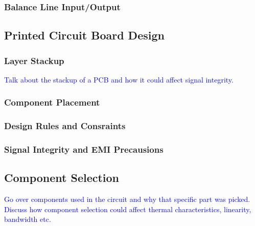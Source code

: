 \documentclass[10pt]{article}
\begin{document}
\begin{multicols*}{2}
\begin{minipage}{\linewidth}
\begin{tikzpicture}[scale = 0.9, transform shape]

                        \end{tikzpicture}

                        \label{fig:pwr-mng}

                    \end{minipage}

                \subsubsection{Balance Line Input/Output}

            \subsection{Printed Circuit Board Design}

                \subsubsection{Layer Stackup}
                    \textcolor{blue}{Talk about the stackup of a PCB and how it could affect signal integrity.}

                \subsubsection{Component Placement}

                \subsubsection{Design Rules and Consraints}

                \subsubsection{Signal Integrity and EMI Precausions}

            \subsection{Component Selection}
                \textcolor{blue}{Go over components used in the circuit and why that specific part was picked. Discuss how component selection could affect thermal characteristics, linearity, bandwidth etc.}
        

\end{multicols*}
\end{document}
